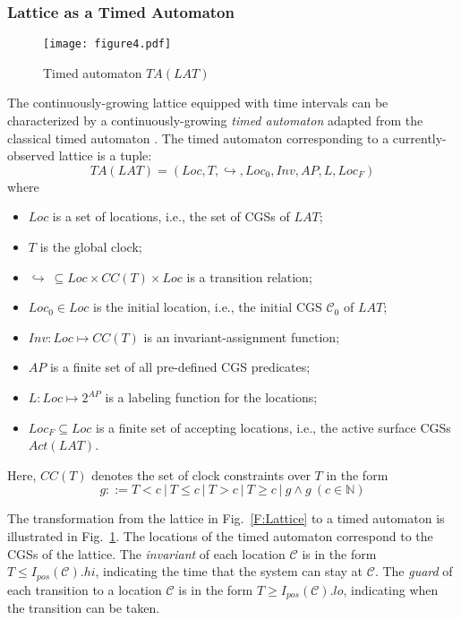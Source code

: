 \documentclass[10pt,conference,compsocconf,letterpaper]{IEEEtran}
\begin{document}
\subsubsection{Lattice as a Timed Automaton}\label{sec:lattice as a TA}
\begin{figure}[tbp]
\begin{center}
  \texttt{[image: figure4.pdf]}
  \caption{Timed automaton $TA(LAT)$}
  \label{F:timed automaton}
\end{center}
\end{figure}

The continuously-growing lattice equipped with time intervals can be characterized by a continuously-growing \textit{timed automaton} adapted from the classical timed automaton \cite{Alur94, Baier08}. The timed automaton corresponding to a currently-observed lattice is a tuple:
\begin{equation*}
  TA(LAT) = (Loc, T, \hookrightarrow, Loc_0, Inv, AP, L, Loc_F)
\end{equation*}
where
\begin{itemize}\setlength{\itemsep}{0pt}
    \item $Loc$ is a set of locations, i.e., the set of CGSs of $LAT$;
    \item $T$ is the global clock;
    \item $\hookrightarrow\ \subseteq Loc \times CC(T) \times Loc$ is a transition relation;
    \item $Loc_0 \in Loc$ is the initial location, i.e., the initial CGS $\mathcal{C}_0$ of $LAT$;
    \item $Inv: Loc \mapsto CC(T)$ is an invariant-assignment function;
    \item $AP$ is a finite set of all pre-defined CGS predicates;
    \item $L: Loc \mapsto 2^{AP}$ is a labeling function for the locations;
    \item $Loc_F \subseteq Loc$ is a finite set of accepting locations, i.e., the active surface CGSs $Act(LAT)$.
\end{itemize}

\noindent Here, $CC(T)$ denotes the set of clock constraints over $T$ in the form
\begin{equation*}
  g::= T < c~|~T\leq c~|~T > c~|~T \geq c~|~g \wedge g~(c\in \mathbb{N})
\end{equation*}

The transformation from the lattice in Fig.~\ref{F:Lattice} to a timed automaton is illustrated in Fig.~\ref{F:timed automaton}. The locations of the timed automaton correspond to the CGSs of the lattice. The \textit{invariant} of each location $\mathcal{C}$ is in the form $T\leq I_{pos}(\mathcal{C}).hi$, indicating the time that the system can stay at $\mathcal{C}$. The \textit{guard} of each transition to a location $\mathcal{C}$ is in the form $T \geq I_{pos}(\mathcal{C}).lo$, indicating when the transition can be taken.
\end{document}
